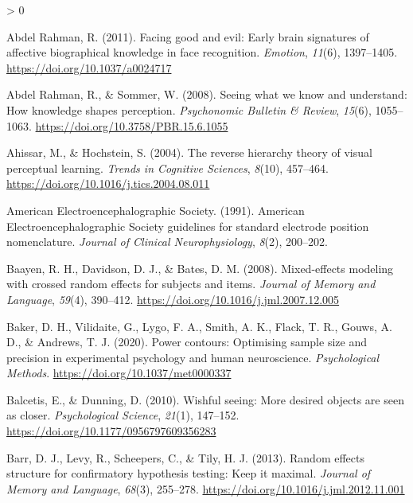\documentclass[
  english,
  doc,12pt,twoside,floatsintext]{apa7}
\newlength{\cslhangindent}
\newenvironment{CSLReferences}[2] %
 {%
  \setlength{\parindent}{0pt}
  \ifodd #1 \everypar{\setlength{\hangindent}{\cslhangindent}}\ignorespaces\fi
  \ifnum #2 > 0
  \setlength{\parskip}{#2\baselineskip}
  \fi
 }%
 {}
\begin{document}
\hypertarget{refs}{}
\begin{CSLReferences}{1}{0}
\leavevmode\hypertarget{ref-abdelrahman2011}{}%
Abdel Rahman, R. (2011). Facing good and evil: Early brain signatures of affective biographical knowledge in face recognition. \emph{Emotion}, \emph{11}(6), 1397--1405. \url{https://doi.org/10.1037/a0024717}

\leavevmode\hypertarget{ref-abdelrahman2008}{}%
Abdel Rahman, R., \& Sommer, W. (2008). Seeing what we know and understand: How knowledge shapes perception. \emph{Psychonomic Bulletin \& Review}, \emph{15}(6), 1055--1063. \url{https://doi.org/10.3758/PBR.15.6.1055}

\leavevmode\hypertarget{ref-ahissar2004}{}%
Ahissar, M., \& Hochstein, S. (2004). The reverse hierarchy theory of visual perceptual learning. \emph{Trends in Cognitive Sciences}, \emph{8}(10), 457--464. \url{https://doi.org/10.1016/j.tics.2004.08.011}

\leavevmode\hypertarget{ref-americanelectroencephalographicsociety1991}{}%
American Electroencephalographic Society. (1991). {American Electroencephalographic Society} guidelines for standard electrode position nomenclature. \emph{Journal of Clinical Neurophysiology}, \emph{8}(2), 200--202.

\leavevmode\hypertarget{ref-baayen2008}{}%
Baayen, R. H., Davidson, D. J., \& Bates, D. M. (2008). Mixed-effects modeling with crossed random effects for subjects and items. \emph{Journal of Memory and Language}, \emph{59}(4), 390--412. \url{https://doi.org/10.1016/j.jml.2007.12.005}

\leavevmode\hypertarget{ref-baker2020}{}%
Baker, D. H., Vilidaite, G., Lygo, F. A., Smith, A. K., Flack, T. R., Gouws, A. D., \& Andrews, T. J. (2020). Power contours: Optimising sample size and precision in experimental psychology and human neuroscience. \emph{Psychological Methods}. \url{https://doi.org/10.1037/met0000337}

\leavevmode\hypertarget{ref-balcetis2010}{}%
Balcetis, E., \& Dunning, D. (2010). Wishful seeing: More desired objects are seen as closer. \emph{Psychological Science}, \emph{21}(1), 147--152. \url{https://doi.org/10.1177/0956797609356283}

\leavevmode\hypertarget{ref-barr2013}{}%
Barr, D. J., Levy, R., Scheepers, C., \& Tily, H. J. (2013). Random effects structure for confirmatory hypothesis testing: Keep it maximal. \emph{Journal of Memory and Language}, \emph{68}(3), 255--278. \url{https://doi.org/10.1016/j.jml.2012.11.001}


\end{CSLReferences}
\end{document}
